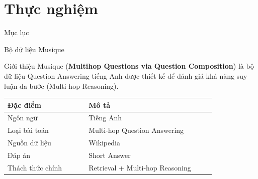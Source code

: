 \documentclass{beamer}
\begin{document}
    
    


\section{Thực nghiệm}
\begin{frame}{Mục lục}
    \tableofcontents[currentsection]
\end{frame}


\begin{frame}{Bộ dữ liệu Musique}
\small

\begin{block}{Giới thiệu}
Musique (\textbf{Multihop Questions via Question Composition}) là bộ dữ liệu Question Answering tiếng Anh được thiết kế để đánh giá khả năng suy luận đa bước (Multi-hop Reasoning).
\end{block}

\begin{center}
\begin{tabular}{p{0.32\linewidth} p{0.50\linewidth}}
\toprule
\textbf{Đặc điểm} & \textbf{Mô tả} \\
\midrule
Ngôn ngữ & Tiếng Anh \\
Loại bài toán & Multi-hop Question Answering \\
Nguồn dữ liệu & Wikipedia \\
Đáp án & Short Answer \\
Thách thức chính & Retrieval + Multi-hop Reasoning \\
\bottomrule
\end{tabular}
\end{center}

\vspace{0.2cm}

\end{frame}
\end{document}
